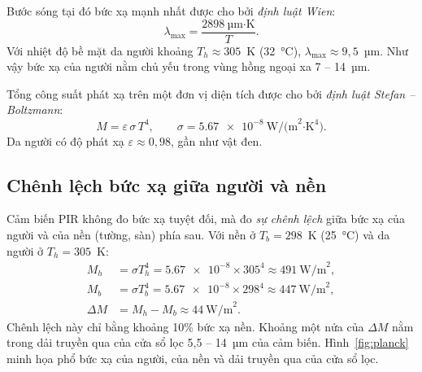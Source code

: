 Bước sóng tại đó bức xạ mạnh nhất được cho bởi \emph{định luật Wien}:
\begin{equation}
  \lambda_{\max} = \frac{2898~\text{µm·K}}{T}.
  \label{eq:wien}
\end{equation}
Với nhiệt độ bề mặt da người khoảng $T_h \approx 305$~K (32~°C), $\lambda_{\max} \approx 9{,}5$~µm. Như vậy bức xạ của người nằm chủ yếu trong vùng hồng ngoại xa 7 -- 14~µm.

Tổng công suất phát xạ trên một đơn vị diện tích được cho bởi \emph{định luật Stefan -- Boltzmann}:
\begin{equation}
  M = \varepsilon\,\sigma\,T^4,\qquad \sigma = \num{5.67e-8}~\text{W/(m}^2\text{·K}^4).
  \label{eq:stefan}
\end{equation}
Da người có độ phát xạ $\varepsilon \approx 0{,}98$, gần như vật đen.

\subsection{Chênh lệch bức xạ giữa người và nền}

Cảm biến PIR không đo bức xạ tuyệt đối, mà đo \emph{sự chênh lệch} giữa bức xạ của người và của nền (tường, sàn) phía sau. Với nền ở $T_b = 298$~K (25~°C) và da người ở $T_h = 305$~K:
\begin{align}
  M_h &= \sigma T_h^4 = \num{5.67e-8}\times 305^4 \approx 491~\text{W/m}^2, \nonumber\\
  M_b &= \sigma T_b^4 = \num{5.67e-8}\times 298^4 \approx 447~\text{W/m}^2, \nonumber\\
  \Delta M &= M_h - M_b \approx 44~\text{W/m}^2 .
  \label{eq:deltaM}
\end{align}
Chênh lệch này chỉ bằng khoảng 10\% bức xạ nền. Khoảng một nửa của $\Delta M$ nằm trong dải truyền qua của cửa sổ lọc 5,5 -- 14~µm của cảm biến. Hình~\ref{fig:planck} minh họa phổ bức xạ của người, của nền và dải truyền qua của cửa sổ lọc.

